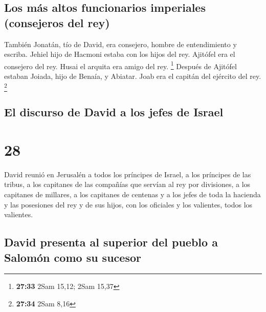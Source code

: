 \hypertarget{los-muxe1s-altos-funcionarios-imperiales-consejeros-del-rey}{%
\subsection{Los más altos funcionarios imperiales (consejeros del
rey)}\label{los-muxe1s-altos-funcionarios-imperiales-consejeros-del-rey}}

 También Jonatán, tío de David, era consejero, hombre de
entendimiento y escriba. Jehiel hijo de Hacmoni estaba con los hijos del
rey.  Ajitófel era el consejero del rey. Husai el arquita
era amigo del rey. \footnote{\textbf{27:33} 2Sam 15,12; 2Sam 15,37}
 Después de Ajitófel estaban Joiada, hijo de Benaía, y
Abiatar. Joab era el capitán del ejército del rey. \footnote{\textbf{27:34}
  2Sam 8,16}

\hypertarget{el-discurso-de-david-a-los-jefes-de-israel}{%
\subsection{El discurso de David a los jefes de
Israel}\label{el-discurso-de-david-a-los-jefes-de-israel}}

\hypertarget{section-27}{%
\section{28}\label{section-27}}

 David reunió en Jerusalén a todos los príncipes de
Israel, a los príncipes de las tribus, a los capitanes de las compañías
que servían al rey por divisiones, a los capitanes de millares, a los
capitanes de centenas y a los jefes de toda la hacienda y las posesiones
del rey y de sus hijos, con los oficiales y los valientes, todos los
valientes.

\hypertarget{david-presenta-al-superior-del-pueblo-a-salomuxf3n-como-su-sucesor}{%
\subsection{David presenta al superior del pueblo a Salomón como su
sucesor}\label{david-presenta-al-superior-del-pueblo-a-salomuxf3n-como-su-sucesor}}

